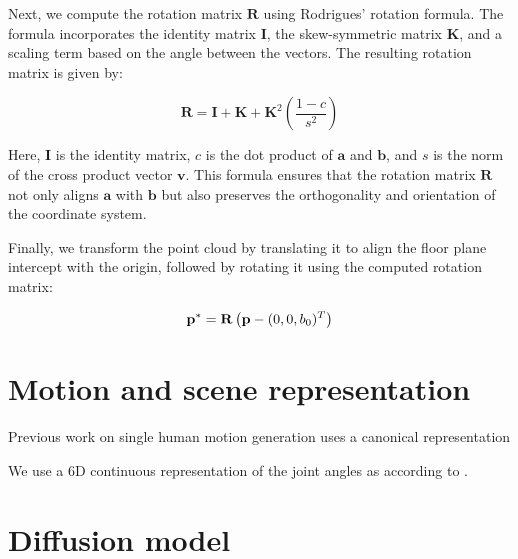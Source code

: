 Next, we compute the rotation matrix $\mathbf{R}$ using Rodrigues' rotation formula. The formula incorporates the identity matrix $\mathbf{I}$, the skew-symmetric matrix $\mathbf{K}$, and a scaling term based on the angle between the vectors. The resulting rotation matrix is given by:

\begin{equation}
    \mathbf{R} = \mathbf{I} + \mathbf{K} + \mathbf{K}^2 \left(\frac{1 - c}{s^2}\right)
\end{equation}

Here, $\mathbf{I}$ is the identity matrix, $c$ is the dot product of $\mathbf{a}$ and $\mathbf{b}$, and $s$ is the norm of the cross product vector $\mathbf{v}$. This formula ensures that the rotation matrix $\mathbf{R}$ not only aligns $\mathbf{a}$ with $\mathbf{b}$ but also preserves the orthogonality and orientation of the coordinate system.

Finally, we transform the point cloud by translating it to align the floor plane intercept with the origin, followed by rotating it using the computed rotation matrix:

\begin{equation}
    \boldsymbol{\mathbf{p}}^* = \mathbf{R} \left(\boldsymbol{\mathbf{p}} - (0, 0, b_0)^T \right) 
\end{equation}




\section{Motion and scene representation}
Previous work on single human motion generation uses a canonical representation 

We use a 6D continuous representation of the joint angles as according to \cite{Zhou_2019_CVPR}.


\section{Diffusion model}



